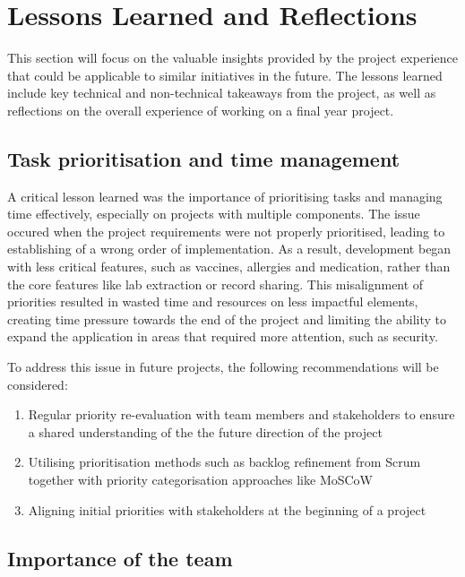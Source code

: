 \section{Lessons Learned and Reflections}

This section will focus on the valuable insights provided by the project experience that could be applicable to similar initiatives in the future. The lessons learned include key technical and non-technical takeaways from the project, as well as reflections on the overall experience of working on a final year project.

\subsection{Task prioritisation and time management}

A critical lesson learned was the importance of prioritising tasks and managing time effectively, especially on projects with multiple components. The issue occured when the project requirements were not properly prioritised, leading to establishing of a wrong order of implementation. As a result, development began with less critical features, such as vaccines, allergies and medication, rather than the core features like lab extraction or record sharing. This misalignment of priorities resulted in wasted time and resources on less impactful elements, creating time pressure towards the end of the project and limiting the ability to expand the application in areas that required more attention, such as security.

To address this issue in future projects, the following recommendations will be considered:
\begin{enumerate}
    \item Regular priority re-evaluation with team members and stakeholders to ensure a shared understanding of the the future direction of the project
    \item Utilising prioritisation methods such as backlog refinement from Scrum together with priority categorisation approaches like MoSCoW
    \item Aligning initial priorities with stakeholders at the beginning of a project
\end{enumerate}

\subsection{Importance of the team}

